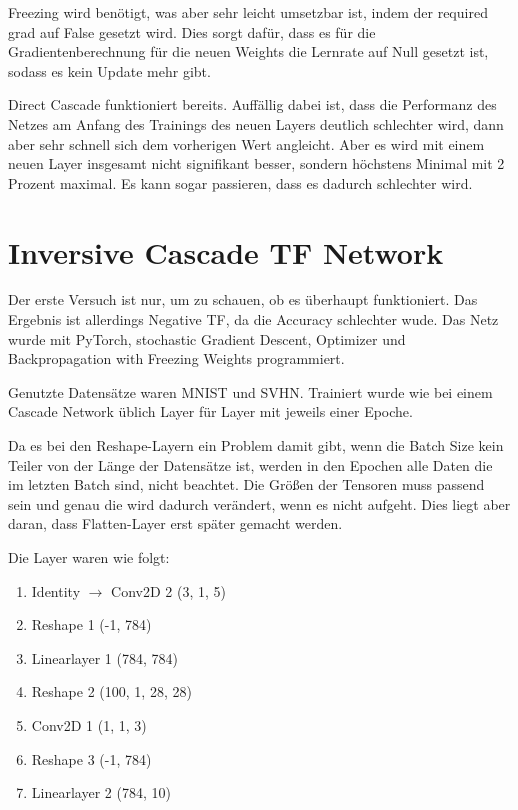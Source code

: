    Freezing wird benötigt, was aber sehr leicht umsetzbar ist, indem 
    der required grad auf False gesetzt wird. Dies sorgt dafür, dass 
    es für die Gradientenberechnung für die neuen Weights die Lernrate 
    auf Null gesetzt ist, sodass es kein Update mehr gibt.

    Direct Cascade funktioniert bereits. Auffällig dabei ist, dass 
    die Performanz des Netzes am Anfang des Trainings des neuen Layers 
    deutlich schlechter wird, dann aber sehr schnell sich dem vorherigen 
    Wert angleicht. Aber es wird mit einem neuen Layer insgesamt nicht 
    signifikant besser, sondern höchstens Minimal mit 2 Prozent maximal. 
    Es kann sogar passieren, dass es dadurch schlechter wird.
    
\section{Inversive Cascade TF Network}

    Der erste Versuch ist nur, um zu schauen, ob es überhaupt funktioniert. 
    Das Ergebnis ist allerdings Negative TF, da die Accuracy schlechter wude. 
    Das Netz wurde mit PyTorch, stochastic Gradient Descent, Optimizer und 
    Backpropagation with Freezing Weights programmiert. 

    Genutzte Datensätze waren MNIST und SVHN. Trainiert wurde wie bei einem 
    Cascade Network üblich Layer für Layer mit jeweils einer Epoche.

    Da es bei den Reshape-Layern ein Problem damit gibt, wenn die Batch Size kein Teiler 
    von der Länge der Datensätze ist, werden in den Epochen alle Daten die im letzten Batch 
    sind, nicht beachtet. Die Größen der Tensoren muss passend sein und genau die wird 
    dadurch verändert, wenn es nicht aufgeht. Dies liegt aber daran, dass Flatten-Layer 
    erst später gemacht werden.

    Die Layer waren wie folgt: 
    \begin{enumerate}
        \item Identity $\rightarrow$ Conv2D 2 (3, 1, 5)
        \item Reshape 1 (-1, 784)
        \item Linearlayer 1 (784, 784)
        \item Reshape 2 (100, 1, 28, 28)
        \item Conv2D 1 (1, 1, 3)
        \item Reshape 3 (-1, 784)
        \item Linearlayer 2 (784, 10)
    \end{enumerate}

